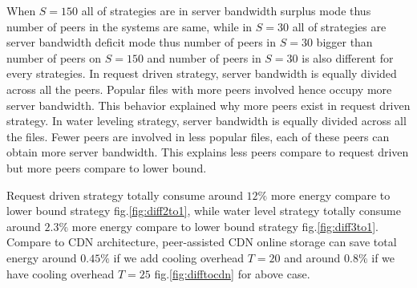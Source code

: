\documentclass[conference]{IEEEtran}
\begin{document}



When $S=150$ all of strategies are in server bandwidth surplus mode thus number of peers in the systems are same, while in $S=30$ all of strategies are server bandwidth deficit mode thus number of peers in $S=30$ bigger than number of peers on $S=150$ and number of peers in $S=30$ is also different for every strategies. 
In request driven strategy, server bandwidth is equally divided across all the peers. 
Popular files with more peers involved hence occupy more server bandwidth. 
This behavior explained why more peers exist in request driven strategy.
In water leveling strategy, server bandwidth is equally divided across all the files.  
Fewer peers are involved in less popular files, each of these peers can obtain more server bandwidth.  
This explains less peers compare to request driven but more peers compare to lower bound.

Request driven strategy totally consume around $12\%$ more energy compare to lower bound strategy fig.\ref{fig:diff2to1}, while water level strategy totally consume around $2.3\%$ more energy compare to lower bound strategy fig.\ref{fig:diff3to1}.
Compare to CDN architecture, peer-assisted CDN online storage can save total energy around $0.45\%$ if we add cooling overhead $T=20$ and around $0.8\%$ if we have cooling overhead $T=25$ fig.\ref{fig:difftocdn} for above case. 
\end{document}
